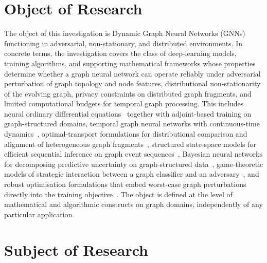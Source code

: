 \section*{Object of Research}

The object of this investigation is Dynamic Graph Neural Networks (GNNs) functioning in adversarial, non-stationary, and distributed environments. In concrete terms, the investigation covers the class of deep-learning models, training algorithms, and supporting mathematical frameworks whose properties determine whether a graph neural network can operate reliably under adversarial perturbation of graph topology and node features, distributional non-stationarity of the evolving graph, privacy constraints on distributed graph fragments, and limited computational budgets for temporal graph processing. This includes neural ordinary differential equations~\cite{Chen2018,Pontryagin1962} together with adjoint-based training on graph-structured domains, temporal graph neural networks with continuous-time dynamics~\cite{Xu2020tgat,Rossi2020,Chamberlain2021}, optimal-transport formulations for distributional comparison and alignment of heterogeneous graph fragments~\cite{Villani2009,Peyre2019}, structured state-space models for efficient sequential inference on graph event sequences~\cite{Gu2022,Dao2024,Behrouz2024graphmamba}, Bayesian neural networks for decomposing predictive uncertainty on graph-structured data~\cite{Blundell2015,Lakshminarayanan2017}, game-theoretic models of strategic interaction between a graph classifier and an adversary~\cite{Tambe2011,Sinha2018}, and robust optimisation formulations that embed worst-case graph perturbations directly into the training objective~\cite{Madry2018,Zhang2019trades}. The object is defined at the level of mathematical and algorithmic constructs on graph domains, independently of any particular application.


\section*{Subject of Research}

